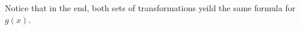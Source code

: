 \begin{pccexample}
\begin{pccsolution}
    Notice that in the end, both sets of transformations yeild the same
    formula for $g(x)$. 
  \end{pccsolution}
  
  
\end{pccexample}
